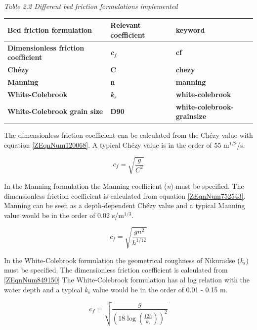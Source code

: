 \documentclass{article}
\begin{document}
\noindent 

\noindent \textit{Table 2.2 Different bed friction formulations implemented}

\begin{tabular}{|p{1.6in}|p{1.1in}|p{1.3in}|} \hline 
\textbf{Bed friction formulation} & \textbf{Relevant coefficient } & \textbf{keyword} \\ \hline 
\textbf{Dimensionless friction coefficient} & \textbf{\textit{c${}_{f}$}} & \textbf{cf} \\ \hline 
\textbf{Chézy } & \textbf{C} & \textbf{chezy} \\ \hline 
\textbf{Manning} & \textbf{n} & \textbf{manning} \\ \hline 
\textbf{White-Colebrook} & \textbf{\textit{k${}_{s}$}} & \textbf{white-colebrook} \\ \hline 
\textbf{White-Colebrook grain size} & \textbf{D90} & \textbf{white-colebrook-grainsize} \\ \hline 
\end{tabular}



\noindent The dimensionless friction coefficient can be calculated from the Chézy value with equation \eqref{ZEqnNum120068}. A typical Chézy value is in the order of 55 m${}^{1/2}$/s.

\noindent 
\begin{equation} \label{ZEqnNum120068} 
c_{f} =\sqrt{\frac{g}{C^{2} } }  
\end{equation} 


\noindent In the Manning formulation the Manning coefficient (\textit{n}) must be specified. The dimensionless friction coefficient is calculated from equation \eqref{ZEqnNum752543}. Manning can be seen as a depth-dependent Chézy value and a typical Manning value would be in the order of 0.02 s/m${}^{1/3}$.

\noindent 
\begin{equation} \label{ZEqnNum752543} 
c_{f} =\sqrt{\frac{gn^{2} }{h^{1/12} } }  
\end{equation} 


\noindent In the White-Colebrook formulation the geometrical roughness of Nikuradse (\textit{k${}_{s}$}) must be specified. The dimensionless friction coefficient is calculated from \eqref{ZEqnNum849150} The White-Colebrook formulation has al log relation with the water depth and a typical \textit{k${}_{s}$} value would be in the order of 0.01 - 0.15 m. 

\noindent 
\begin{equation} \label{ZEqnNum849150} 
c_{f} =\sqrt{\frac{g}{\left(18\log \left(\frac{12h}{k_{s} } \right)\right)^{2} } }  
\end{equation} 
\end{document}

